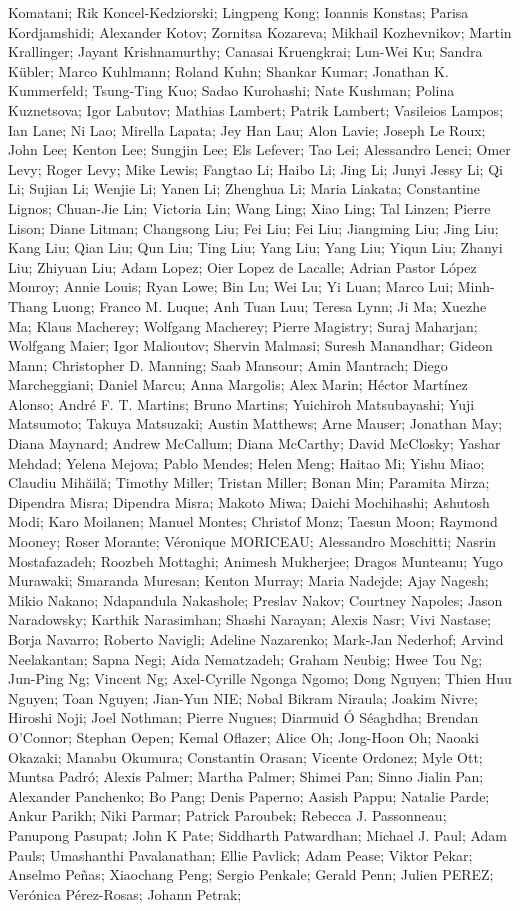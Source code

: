 \documentclass[11pt]{article}
\begin{document}
Komatani; Rik Koncel-Kedziorski; Lingpeng Kong; Ioannis Konstas; Parisa Kordjamshidi; Alexander Kotov; Zornitsa Kozareva; Mikhail Kozhevnikov; Martin Krallinger; Jayant Krishnamurthy; Canasai Kruengkrai; Lun-Wei Ku; Sandra Kübler; Marco Kuhlmann; Roland Kuhn; Shankar Kumar; Jonathan K. Kummerfeld; Tsung-Ting Kuo; Sadao Kurohashi; Nate Kushman; Polina Kuznetsova; Igor Labutov; Mathias Lambert; Patrik Lambert; Vasileios Lampos; Ian Lane; Ni Lao; Mirella Lapata; Jey Han Lau; Alon Lavie; Joseph Le Roux; John Lee; Kenton Lee; Sungjin Lee; Els Lefever; Tao Lei; Alessandro Lenci; Omer Levy; Roger Levy; Mike Lewis; Fangtao Li; Haibo Li; Jing Li; Junyi Jessy Li; Qi Li; Sujian Li; Wenjie Li; Yanen Li; Zhenghua Li; Maria Liakata; Constantine Lignos; Chuan-Jie Lin; Victoria Lin; Wang Ling; Xiao Ling; Tal Linzen; Pierre Lison; Diane Litman; Changsong Liu; Fei Liu; Fei Liu; Jiangming Liu; Jing Liu; Kang Liu; Qian Liu; Qun Liu; Ting Liu; Yang Liu; Yang Liu; Yiqun Liu; Zhanyi Liu; Zhiyuan Liu; Adam Lopez; Oier Lopez de Lacalle; Adrian Pastor López Monroy; Annie Louis; Ryan Lowe; Bin Lu; Wei Lu; Yi Luan; Marco Lui; Minh-Thang Luong; Franco M. Luque; Anh Tuan Luu; Teresa Lynn; Ji Ma; Xuezhe Ma; Klaus Macherey; Wolfgang Macherey; Pierre Magistry; Suraj Maharjan; Wolfgang Maier; Igor Malioutov; Shervin Malmasi; Suresh Manandhar; Gideon Mann; Christopher D. Manning; Saab Mansour; Amin Mantrach; Diego Marcheggiani; Daniel Marcu; Anna Margolis; Alex Marin; Héctor Martínez Alonso; André F. T. Martins; Bruno Martins; Yuichiroh Matsubayashi; Yuji Matsumoto; Takuya Matsuzaki; Austin Matthews; Arne Mauser; Jonathan May; Diana Maynard; Andrew McCallum; Diana McCarthy; David McClosky; Yashar Mehdad; Yelena Mejova; Pablo Mendes; Helen Meng; Haitao Mi; Yishu Miao; Claudiu Mihăilă; Timothy Miller; Tristan Miller; Bonan Min; Paramita Mirza; Dipendra Misra; Dipendra Misra; Makoto Miwa; Daichi Mochihashi; Ashutosh Modi; Karo Moilanen; Manuel Montes; Christof Monz; Taesun Moon; Raymond Mooney; Roser Morante; Véronique MORICEAU; Alessandro Moschitti; Nasrin Mostafazadeh; Roozbeh Mottaghi; Animesh Mukherjee; Dragos Munteanu; Yugo Murawaki; Smaranda Muresan; Kenton Murray; Maria Nadejde; Ajay Nagesh; Mikio Nakano; Ndapandula Nakashole; Preslav Nakov; Courtney Napoles; Jason Naradowsky; Karthik Narasimhan; Shashi Narayan; Alexis Nasr; Vivi Nastase; Borja Navarro; Roberto Navigli; Adeline Nazarenko; Mark-Jan Nederhof; Arvind Neelakantan; Sapna Negi; Aida Nematzadeh; Graham Neubig; Hwee Tou Ng; Jun-Ping Ng; Vincent Ng; Axel-Cyrille Ngonga Ngomo; Dong Nguyen; Thien Huu Nguyen; Toan Nguyen; Jian-Yun NIE; Nobal Bikram Niraula; Joakim Nivre; Hiroshi Noji; Joel Nothman; Pierre Nugues; Diarmuid Ó Séaghdha; Brendan O'Connor; Stephan Oepen; Kemal Oflazer; Alice Oh; Jong-Hoon Oh; Naoaki Okazaki; Manabu Okumura; Constantin Orasan; Vicente Ordonez; Myle Ott; Muntsa Padró; Alexis Palmer; Martha Palmer; Shimei Pan; Sinno Jialin Pan; Alexander Panchenko; Bo Pang; Denis Paperno; Aasish Pappu; Natalie Parde; Ankur Parikh; Niki Parmar; Patrick Paroubek; Rebecca J. Passonneau; Panupong Pasupat; John K Pate; Siddharth Patwardhan; Michael J. Paul; Adam Pauls; Umashanthi Pavalanathan; Ellie Pavlick; Adam Pease; Viktor Pekar; Anselmo Peñas; Xiaochang Peng; Sergio Penkale; Gerald Penn; Julien PEREZ; Verónica Pérez-Rosas; Johann Petrak; 
\end{document}
